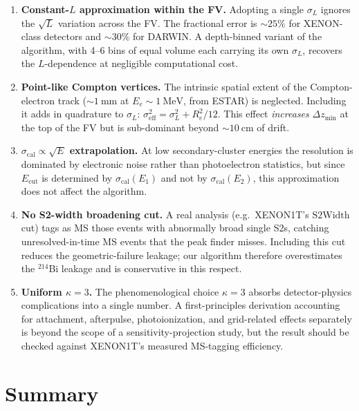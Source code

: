\documentclass[11pt,a4paper]{article}
\begin{document}
\begin{enumerate}
\item \textbf{Constant-$L$ approximation within the FV.} Adopting a
single $\sigma_L$ ignores the $\sqrt{L}$ variation across the FV.
The fractional error is $\sim\!25\%$ for XENON-class detectors and
$\sim\!30\%$ for DARWIN. A depth-binned variant of the algorithm,
with 4--6 bins of equal volume each carrying its own $\sigma_L$,
recovers the $L$-dependence at negligible computational cost.

\item \textbf{Point-like Compton vertices.} The intrinsic spatial
extent of the Compton-electron track ($\sim\!\SI{1}{\milli\meter}$
at $E_e \sim \SI{1}{\MeV}$, from ESTAR) is neglected. Including it
adds in quadrature to $\sigma_L$:
$\sigma_{\mathrm{eff}}^2 = \sigma_L^2 + R_e^2/12$. This effect
\emph{increases} $\Delta z_{\min}$ at the top of the FV but is
sub-dominant beyond $\sim\!\SI{10}{\centi\meter}$ of drift.

\item \textbf{$\sigma_{\mathrm{cal}} \propto \sqrt{E}$ extrapolation.}
At low secondary-cluster energies the resolution is dominated by
electronic noise rather than photoelectron statistics, but since
$E_{\mathrm{cut}}$ is determined by $\sigma_{\mathrm{cal}}(E_1)$ and
not by $\sigma_{\mathrm{cal}}(E_2)$, this approximation does not
affect the algorithm.

\item \textbf{No S2-width broadening cut.} A real analysis (e.g.\
XENON1T's $\mathrm{S2Width}$ cut) tags as MS those events with
abnormally broad single S2s, catching unresolved-in-time MS events
that the peak finder misses. Including this cut reduces the
geometric-failure leakage; our algorithm therefore overestimates the
$^{214}$Bi leakage and is conservative in this respect.

\item \textbf{Uniform $\kappa = 3$.} The phenomenological choice
$\kappa = 3$ absorbs detector-physics complications into a single
number. A first-principles derivation accounting for attachment,
afterpulse, photoionization, and grid-related effects separately is
beyond the scope of a sensitivity-projection study, but the result
should be checked against XENON1T's measured MS-tagging efficiency.
\end{enumerate}

\section{Summary}
\end{document}
